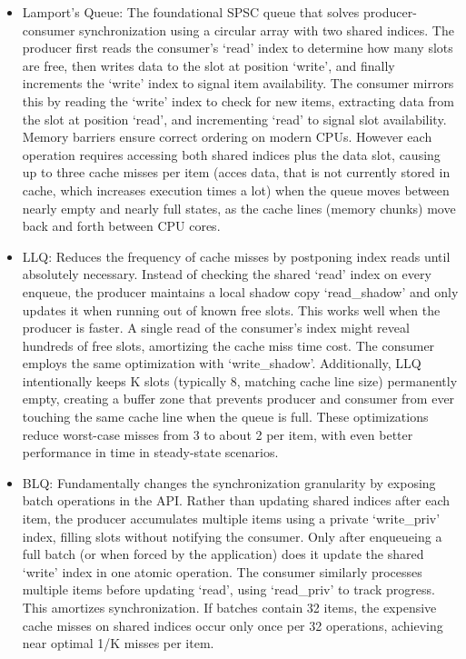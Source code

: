 \begin{itemize}
   \item Lamport's Queue: The foundational SPSC queue that solves producer-consumer synchronization using a circular array with two shared indices. The producer first reads the consumer's \enquote*{read} index to determine how many slots are free, then writes data to the slot at position \enquote*{write}, and finally increments the \enquote*{write} index to signal item availability. The consumer mirrors this by reading the \enquote*{write} index to check for new items, extracting data from the slot at position \enquote*{read}, and incrementing \enquote*{read} to signal slot availability. Memory barriers ensure correct ordering on modern CPUs. However each operation requires accessing both shared indices plus the data slot, causing up to three cache misses per item (acces data, that is not currently stored in cache, which increases execution times a lot) when the queue moves between nearly empty and nearly full states, as the cache lines (memory chunks) move back and forth between CPU cores. \cite{Lamport1983SPSCCircularBuffer,MaffioneCacheAware}
   \item \ac{LLQ}: Reduces the frequency of cache misses by postponing index reads until absolutely necessary. Instead of checking the shared \enquote*{read} index on every enqueue, the producer maintains a local shadow copy \enquote*{read\_shadow} and only updates it when running out of known free slots. This works well when the producer is faster. A single read of the consumer's index might reveal hundreds of free slots, amortizing the cache miss time cost. The consumer employs the same optimization with \enquote*{write\_shadow}. Additionally, \ac{LLQ} intentionally keeps K slots (typically 8, matching cache line size) permanently empty, creating a buffer zone that prevents producer and consumer from ever touching the same cache line when the queue is full. These optimizations reduce worst-case misses from 3 to about 2 per item, with even better performance in time in steady-state scenarios. \cite{MaffioneCacheAware}
   \item \ac{BLQ}: Fundamentally changes the synchronization granularity by exposing batch operations in the API. Rather than updating shared indices after each item, the producer accumulates multiple items using a private \enquote*{write\_priv} index, filling slots without notifying the consumer. Only after enqueueing a full batch (or when forced by the application) does it update the shared \enquote*{write} index in one atomic operation. The consumer similarly processes multiple items before updating \enquote*{read}, using \enquote*{read\_priv} to track progress. This amortizes synchronization. If batches contain 32 items, the expensive cache misses on shared indices occur only once per 32 operations, achieving near optimal 1/K misses per item. \cite{MaffioneCacheAware}

\end{itemize}
